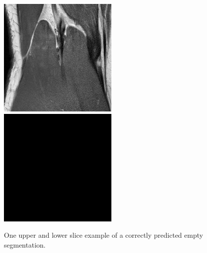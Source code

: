 \begin{figure}[H]
\endminipage\hfill
{}%
  \includegraphics[width=\linewidth]{imgs/a6.png}
\endminipage\hfill
{}%
  \includegraphics[width=\linewidth]{imgs/b6.png}
\endminipage
\caption{One upper and lower slice example of a correctly predicted empty segmentation.}
\end{figure}

